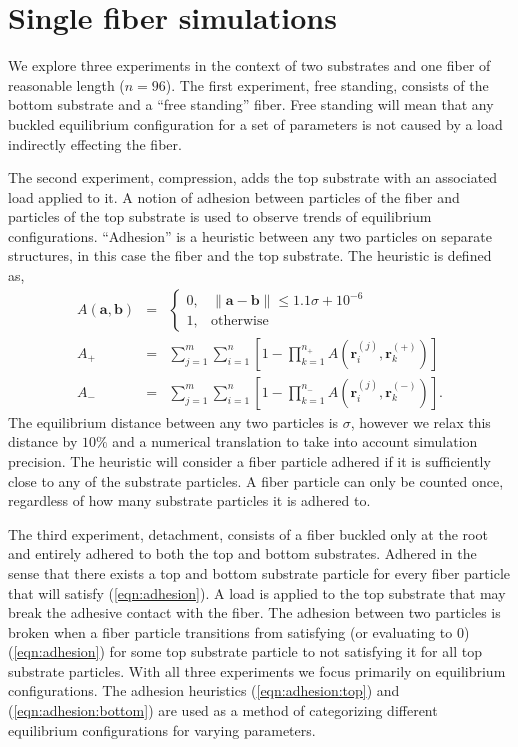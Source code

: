 \chapter{Single fiber simulations} \label{chap:three}

We explore three experiments in the context of two substrates and one fiber of reasonable length ($n=96$). The first experiment, free standing, consists of the bottom substrate and a ``free standing'' fiber. Free standing will mean that any buckled equilibrium configuration for a set of parameters is not caused by a load indirectly effecting the fiber.

The second experiment, compression, adds the top substrate with an associated load applied to it. A notion of adhesion between particles of the fiber and particles of the top substrate is used to observe trends of equilibrium configurations. ``Adhesion'' is a heuristic between any two particles on separate structures, in this case the fiber and the top substrate. The heuristic is defined as,
\begin{eqnarray} \label{eqn:adhesion}
	A(\textbf{a}, \textbf{b}) &=& \left\{ 
		\begin{array}{ll}
			0, & \|\textbf{a} - \textbf{b}\| \leq 1.1 \sigma + 10^{-6}\\
			1, & \mbox{otherwise}
		\end{array}
		\right.  \\
	A_+ &=& \sum_{j=1}^{m} \sum_{i=1}^{n} \left[ 1 - \prod_{k=1}^{n_+} A(\textbf{r}_i^{(j)},\textbf{r}_k^{(+)}) \right] \label{eqn:adhesion:top} \\ 
	A_- &=& \sum_{j=1}^{m} \sum_{i=1}^{n} \left[ 1 - \prod_{k=1}^{n_-} A(\textbf{r}_i^{(j)},\textbf{r}_k^{(-)}) \right]. \label{eqn:adhesion:bottom}
\end{eqnarray}
The equilibrium distance between any two particles is $\sigma$, however we relax this distance by $10\%$ and a numerical translation to take into account simulation precision. The heuristic will consider a fiber particle adhered if it is sufficiently close to any of the substrate particles. A fiber particle can only be counted once, regardless of how many substrate particles it is adhered to.

The third experiment, detachment, consists of a fiber buckled only at the root and entirely adhered to both the top and bottom substrates. Adhered in the sense that there exists a top and bottom substrate particle for every fiber particle that will satisfy (\ref{eqn:adhesion}). A load is applied to the top substrate that may break the adhesive contact with the fiber. The adhesion between two particles is broken when a fiber particle transitions from satisfying (or evaluating to $0$) (\ref{eqn:adhesion}) for some top substrate particle to not satisfying it for all top substrate particles. With all three experiments we focus primarily on equilibrium configurations. The adhesion heuristics (\ref{eqn:adhesion:top}) and (\ref{eqn:adhesion:bottom}) are used as a method of categorizing different equilibrium configurations for varying parameters.

